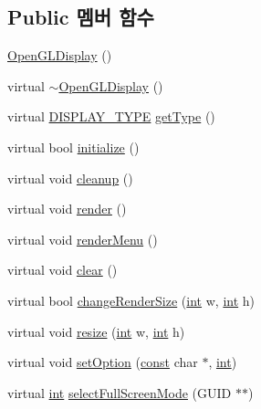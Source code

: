 \subsection*{Public 멤버 함수}
\begin{DoxyCompactItemize}
\item 
\mbox{\hyperlink{class_open_g_l_display_a0f3b7bf3f93a98c5726cbe2797fc595b}{Open\+G\+L\+Display}} ()
\item 
virtual \mbox{\hyperlink{class_open_g_l_display_ac628237ab5084bd4f74178b69fb51088}{$\sim$\+Open\+G\+L\+Display}} ()
\item 
virtual \mbox{\hyperlink{_display_8h_aa50f63b0688d0250e0be64d8401d09a0}{D\+I\+S\+P\+L\+A\+Y\+\_\+\+T\+Y\+PE}} \mbox{\hyperlink{class_open_g_l_display_a82bec99b2136823801a0cf90813de9c2}{get\+Type}} ()
\item 
virtual bool \mbox{\hyperlink{class_open_g_l_display_af0db619c7083f43e9bc61f1705843b53}{initialize}} ()
\item 
virtual void \mbox{\hyperlink{class_open_g_l_display_a870bdc3cf12a50ff23755e1869f9026e}{cleanup}} ()
\item 
virtual void \mbox{\hyperlink{class_open_g_l_display_aa0ae6cc7e0a15da37e167d6f91590c49}{render}} ()
\item 
virtual void \mbox{\hyperlink{class_open_g_l_display_a55b32d45baec33ca6f800e5d847cb8f4}{render\+Menu}} ()
\item 
virtual void \mbox{\hyperlink{class_open_g_l_display_abef343fb8d951b4bc63bd3b7afe285a2}{clear}} ()
\item 
virtual bool \mbox{\hyperlink{class_open_g_l_display_aa0dc96c6070cadf3eb6e52875a72b449}{change\+Render\+Size}} (\mbox{\hyperlink{_util_8cpp_a0ef32aa8672df19503a49fab2d0c8071}{int}} w, \mbox{\hyperlink{_util_8cpp_a0ef32aa8672df19503a49fab2d0c8071}{int}} h)
\item 
virtual void \mbox{\hyperlink{class_open_g_l_display_aac55119e649c9530a19b6b02fcd4910b}{resize}} (\mbox{\hyperlink{_util_8cpp_a0ef32aa8672df19503a49fab2d0c8071}{int}} w, \mbox{\hyperlink{_util_8cpp_a0ef32aa8672df19503a49fab2d0c8071}{int}} h)
\item 
virtual void \mbox{\hyperlink{class_open_g_l_display_ad92750f75fabf5873f8626cb154f29b9}{set\+Option}} (\mbox{\hyperlink{getopt1_8c_a2c212835823e3c54a8ab6d95c652660e}{const}} char $\ast$, \mbox{\hyperlink{_util_8cpp_a0ef32aa8672df19503a49fab2d0c8071}{int}})
\item 
virtual \mbox{\hyperlink{_util_8cpp_a0ef32aa8672df19503a49fab2d0c8071}{int}} \mbox{\hyperlink{class_open_g_l_display_aade9c3229c9fc024ad55b3d1419499e8}{select\+Full\+Screen\+Mode}} (G\+U\+ID $\ast$$\ast$)
\end{DoxyCompactItemize}


